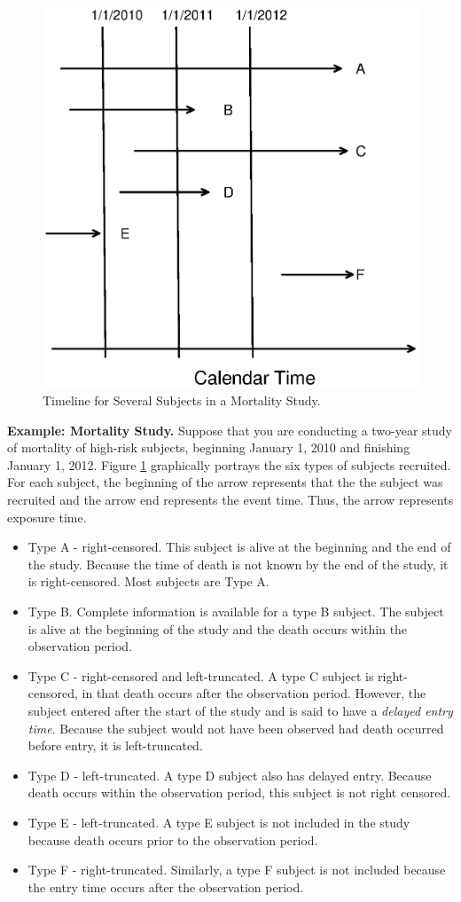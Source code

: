 \linejed

\begin{figure}[htp]
  \begin{center}
    \includegraphics[width=.6\textwidth]{Chapter14Survival/F14Mortality.eps}
    \caption{\label{F14:Mortality}\small Timeline for Several Subjects in a Mortality Study.}
  \end{center}
\end{figure}


\textbf{Example: Mortality Study.} Suppose that you are conducting a
two-year study of mortality of high-risk subjects, beginning January
1, 2010 and finishing January 1, 2012. Figure \ref{F14:Mortality}
graphically portrays the six types of subjects recruited. For each
subject, the beginning of the arrow represents that the the subject
was recruited and the arrow end represents the event time. Thus, the
arrow represents exposure time.


\begin{itemize}
\item Type A - right-censored. This subject is alive at the beginning and the end of
the study. Because the time of death is not known by the end of the
study, it is right-censored. Most subjects are Type A.
\item Type B. Complete information is available for a type B subject. The subject is
alive at the beginning of the study and the death occurs within the
observation period.
\item Type C - right-censored and left-truncated. A type C subject is right-censored,
in that death occurs after the observation period. However, the
subject entered after the start of the study and is said to have a
\emph{delayed entry time}. Because the subject would not have been
observed had death occurred before entry, it is left-truncated.
\item Type D - left-truncated. A type D subject also has delayed entry.
Because death occurs within the observation period, this subject is
not right censored.
\item Type E - left-truncated. A type E subject is not included in the study because
death occurs prior to the observation period.
\item Type F - right-truncated. Similarly, a type F subject is not included because the entry time
occurs after the observation period.
\end{itemize}

